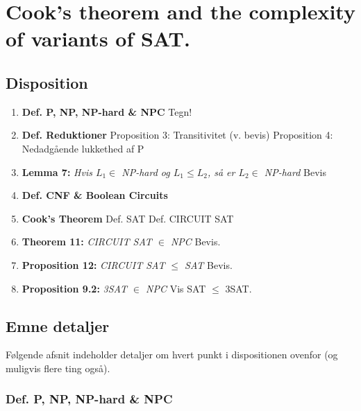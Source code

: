 \section{Cook's theorem and the complexity of variants of SAT.}

\subsection{Disposition}

\begin{enumerate}
 \item \textbf{Def. P, NP, NP-hard \& NPC}
    \subitem  Tegn!
 \item \textbf{Def. Reduktioner}
    \subitem  Proposition 3: Transitivitet (v. bevis)
    \subitem  Proposition 4: Nedadgående lukkethed af P
 \item \textbf{Lemma 7:} \textit{Hvis $L_1 \in$ NP-hard og $L_1 \leq L_2$, så er $L_2 \in$ NP-hard}
    \subitem  Bevis
 \item \textbf{Def. CNF \& Boolean Circuits}
 \item \textbf{Cook's Theorem}
    \subitem Def. SAT
    \subitem Def. CIRCUIT SAT
 \item \textbf{Theorem 11:} \textit{CIRCUIT SAT $\in$ NPC}
    \subitem Bevis.
 \item \textbf{Proposition 12:} \textit{CIRCUIT SAT $\leq$ SAT}
    \subitem Bevis.
 \item \textbf{Proposition 9.2:} \textit{3SAT $\in$ NPC}
    \subitem Vis SAT $\leq$ 3SAT.
\end{enumerate}

\subsection{Emne detaljer}

Følgende afsnit indeholder detaljer om hvert punkt i dispositionen ovenfor (og muligvis flere ting også).


\subsubsection{Def. P, NP, NP-hard \& NPC}


